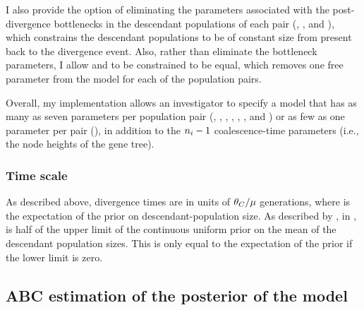 I also provide the option of eliminating the parameters associated with the
post-divergence bottlenecks in the descendant populations of each pair
(\bottleTime{}, , and ),
which constrains the descendant populations to be of
constant size from present back to the divergence event.
Also, rather than eliminate the bottleneck parameters,
I allow  and  to be constrained to be
equal, which removes one free parameter from the model for each of the
population pairs.

Overall, my implementation allows an investigator to specify a model that has
as many as seven parameters per population pair
(\ancestralTheta{}, , ,
\bottleTime{}, , , and
\migrationRate{})
or as few as one parameter per pair
(\myTheta{}),
in addition to the $\popSampleSize{i}{} - 1$ coalescence-time parameters
(i.e., the node heights of the gene tree).

\subsubsection{Time scale}
As described above, divergence times are in units of
$\theta_{C}/\mu$ generations, where  is the expectation
of the prior on descendant-population size.
As described by \cite{Oaks2012}, in \msb,  is half of the upper
limit of the continuous uniform prior on the mean of the descendant population
sizes.
This is only equal to the expectation of the prior if the lower limit is zero.

\subsection{ABC estimation of the posterior of the model}
